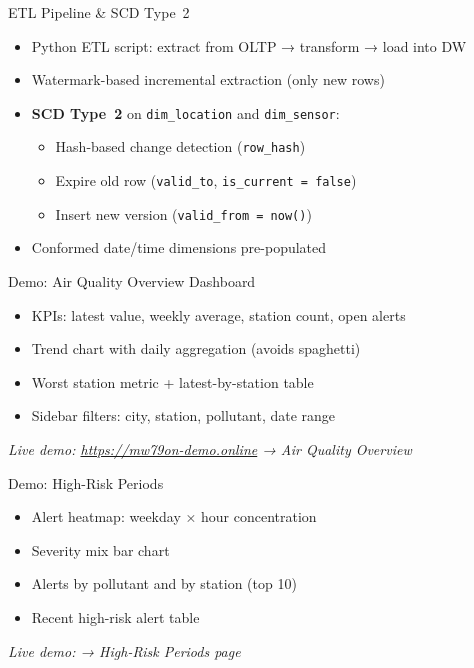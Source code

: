 \documentclass[aspectratio=169]{beamer}
\begin{document}
\begin{frame}{ETL Pipeline \& SCD Type~2}
\begin{itemize}
  \item Python ETL script: extract from OLTP → transform → load into DW
  \item Watermark-based incremental extraction (only new rows)
  \item \textbf{SCD Type~2} on \texttt{dim\_location} and \texttt{dim\_sensor}:
  \begin{itemize}
    \item Hash-based change detection (\texttt{row\_hash})
    \item Expire old row (\texttt{valid\_to}, \texttt{is\_current = false})
    \item Insert new version (\texttt{valid\_from = now()})
  \end{itemize}
  \item Conformed date/time dimensions pre-populated
\end{itemize}
\end{frame}

\begin{frame}{Demo: Air Quality Overview Dashboard}
\begin{itemize}
  \item KPIs: latest value, weekly average, station count, open alerts
  \item Trend chart with daily aggregation (avoids spaghetti)
  \item Worst station metric + latest-by-station table
  \item Sidebar filters: city, station, pollutant, date range
\end{itemize}
\vspace{0.5em}
\textit{Live demo: \url{https://mw79on-demo.online} → Air Quality Overview}
\end{frame}

\begin{frame}{Demo: High-Risk Periods}
\begin{itemize}
  \item Alert heatmap: weekday × hour concentration
  \item Severity mix bar chart
  \item Alerts by pollutant and by station (top 10)
  \item Recent high-risk alert table
\end{itemize}
\vspace{0.5em}
\textit{Live demo: → High-Risk Periods page}
\end{frame}
\end{document}
